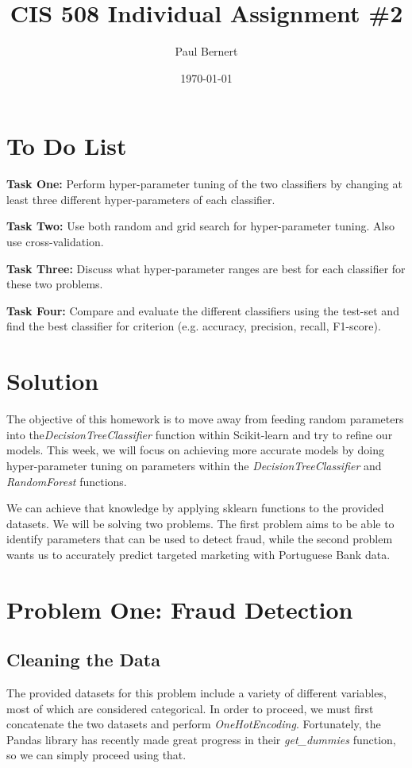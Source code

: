 \documentclass[notitlepage]{report}
\title{CIS 508 Individual Assignment \#2}
\author{Paul Bernert}
\date{\today}
\begin{document}
\maketitle
\thispagestyle{empty}

\section*{To Do List}

\qquad \textbf{Task One:} Perform hyper-parameter tuning of the two classifiers by changing at least three different hyper-parameters of each classifier.

\qquad \textbf{Task Two:} Use both random and grid search for hyper-parameter tuning. Also use cross-validation.

\qquad \textbf{Task Three:} Discuss what hyper-parameter ranges are best for each classifier for these two problems.

\qquad \textbf{Task Four:} Compare and evaluate the different classifiers using the test-set and find the best classifier for criterion (e.g. accuracy, precision, recall, F1-score). 

\section*{Solution}
The objective of this homework is to move away from feeding random parameters into the\textit{DecisionTreeClassifier} function within Scikit-learn and try to refine our models. This week, we will focus on achieving more accurate models by doing hyper-parameter tuning on parameters within the \textit{DecisionTreeClassifier} and \textit{RandomForest} functions. 

We can achieve that knowledge by applying sklearn functions to the provided datasets. We will be solving two problems. The first problem aims to be able to identify parameters that can be used to detect fraud, while the second problem wants us to accurately predict targeted marketing with Portuguese Bank data.

\section*{Problem One: Fraud Detection}

\subsection*{Cleaning the Data}
The provided datasets for this problem include a variety of different variables, most of which are considered categorical. In order to proceed, we must first concatenate the two datasets and perform \textit{OneHotEncoding}. Fortunately, the Pandas library has recently made great progress in their \textit{get\_dummies} function, so we can simply proceed using that.
\end{document}
